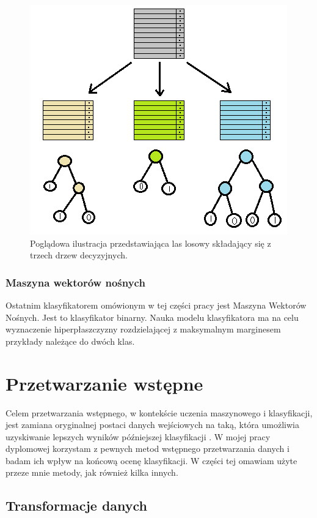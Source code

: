 \documentclass[../thesis.tex]{subfiles}
\begin{document}
\begin{figure}[h]
\centering
\includegraphics[height=.3\textheight]{random_forest.png}
\caption{Poglądowa ilustracja przedstawiająca las losowy składający się z trzech drzew decyzyjnych.}
\label{classification:random_forest}
\end{figure}

\subsubsection{Maszyna wektorów nośnych}

Ostatnim klasyfikatorem omówionym w tej części pracy jest Maszyna Wektorów Nośnych. Jest to klasyfikator binarny. Nauka modelu klasyfikatora ma na celu wyznaczenie hiperpłaszczyzny rozdzielającej z maksymalnym marginesem przykłady należące do dwóch klas.

\section{Przetwarzanie wstępne}

Celem przetwarzania wstępnego, w kontekście uczenia maszynowego i klasyfikacji, jest zamiana oryginalnej postaci danych wejściowych na taką, która umożliwia uzyskiwanie lepszych wyników późniejszej klasyfikacji \cite{def_preprocessing}. W mojej pracy dyplomowej korzystam z pewnych metod wstępnego przetwarzania danych i badam ich wpływ na końcową ocenę klasyfikacji. W części tej omawiam użyte przeze mnie metody, jak również kilka innych.

\subsection{Transformacje danych}
\end{document}
